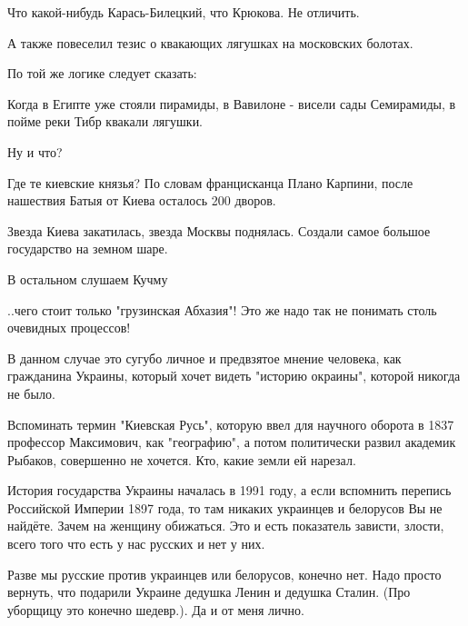 \begin{itemize}
Что какой-нибудь Карась-Билецкий, что Крюкова. Не отличить.

 

А также повеселил тезис о квакающих лягушках на московских болотах.

По той же логике следует сказать:

Когда в Египте уже стояли пирамиды, в Вавилоне - висели сады Семирамиды, в
пойме реки Тибр квакали лягушки.

Ну и что?

Где те киевские князья? По словам францисканца Плано Карпини, после нашествия
Батыя от Киева осталось 200 дворов.

Звезда Киева закатилась, звезда Москвы поднялась. Создали самое большое
государство на земном шаре.

В остальном слушаем Кучму

 

..чего стоит только "грузинская Абхазия"! Это же надо так не понимать столь очевидных процессов!


 

В данном случае это сугубо личное и предвзятое мнение человека, как гражданина
Украины, который хочет видеть "историю окраины", которой никогда не было.

Вспоминать термин "Киевская Русь", которую ввел для научного оборота в 1837
профессор Максимович, как "географию", а потом политически развил академик
Рыбаков, совершенно не хочется. Кто, какие земли ей нарезал. 

История государства Украины началась в 1991 году, а если вспомнить перепись
Российской Империи 1897 года, то там никаких украинцев и белорусов Вы не
найдёте. Зачем на женщину обижаться. Это и есть показатель зависти, злости,
всего того что есть у нас русских и нет у них. 

Разве мы русские против украинцев или белорусов, конечно нет. Надо просто
вернуть, что подарили Украине дедушка Ленин и дедушка Сталин. (Про уборщицу это
конечно шедевр.). Да и от меня лично. 


\end{itemize}
